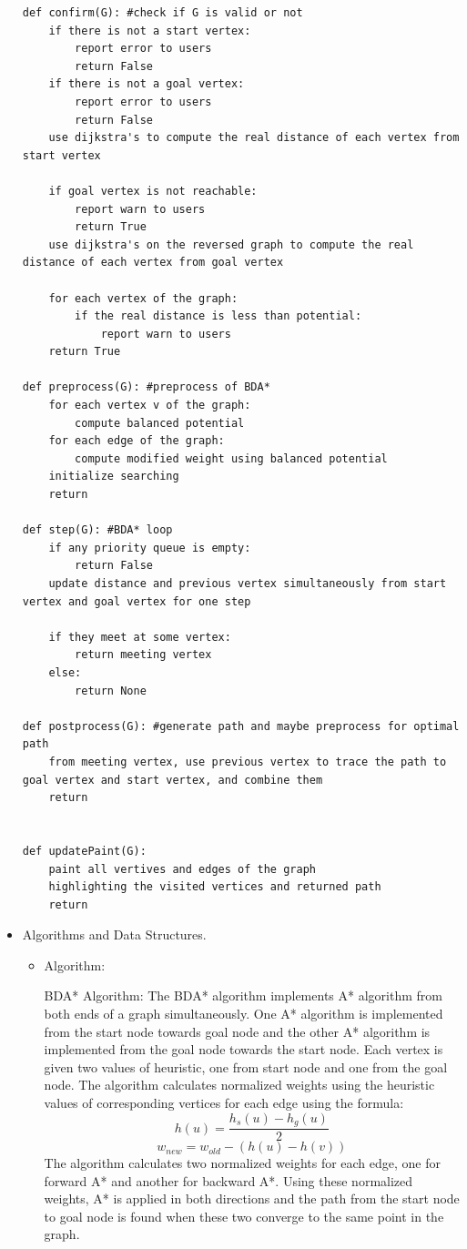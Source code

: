 \begin{itemize}
\begin{lstlisting}[breaklines=true, frame=single]
def confirm(G): #check if G is valid or not
    if there is not a start vertex:
        report error to users
        return False
    if there is not a goal vertex:
        report error to users
        return False
    use dijkstra's to compute the real distance of each vertex from start vertex

    if goal vertex is not reachable:
        report warn to users
        return True
    use dijkstra's on the reversed graph to compute the real distance of each vertex from goal vertex

    for each vertex of the graph:
        if the real distance is less than potential:
            report warn to users
    return True

def preprocess(G): #preprocess of BDA*
    for each vertex v of the graph:
        compute balanced potential
    for each edge of the graph:
        compute modified weight using balanced potential
    initialize searching
    return

def step(G): #BDA* loop
    if any priority queue is empty:
        return False
    update distance and previous vertex simultaneously from start vertex and goal vertex for one step

    if they meet at some vertex:
        return meeting vertex
    else:
        return None

def postprocess(G): #generate path and maybe preprocess for optimal path
    from meeting vertex, use previous vertex to trace the path to goal vertex and start vertex, and combine them
    return


def updatePaint(G):
    paint all vertives and edges of the graph
    highlighting the visited vertices and returned path
    return
\end{lstlisting}

\item{Algorithms and  Data Structures. }
\begin{itemize}
    \item Algorithm:

BDA* Algorithm: The BDA* algorithm implements A* algorithm from both ends of a graph simultaneously. One A* algorithm is implemented from the start node towards goal node and the other A* algorithm is implemented from the goal node towards the start node. Each vertex is given two values of heuristic, one from start node and one from the goal node. The algorithm calculates normalized weights using the heuristic values of corresponding vertices for each edge using the formula:
\[h(u) = \frac{h_s(u)-h_g(u)}{2} \]
\[w_{new}=w_{old}-(h(u)-h(v))\]
The algorithm calculates two normalized weights for each edge, one for forward A* and another for backward A*. Using these normalized weights, A* is applied in both directions and the path from the start node to goal node is found when these two converge to the same point in the graph. 


\end{itemize}
\end{itemize}
